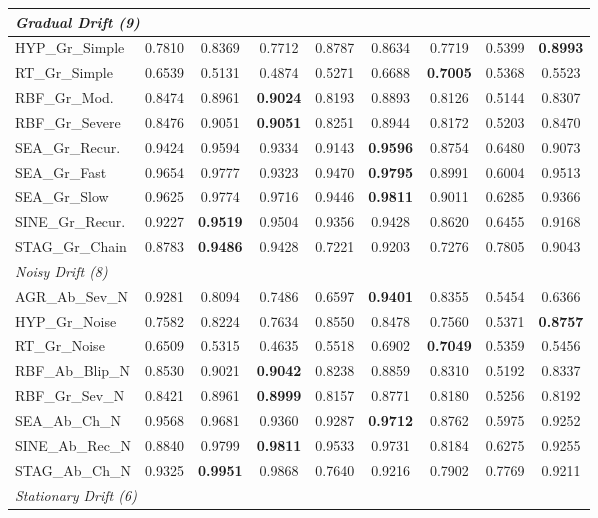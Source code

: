 \documentclass[lettersize,10pt]{article}
\begin{document}
\begin{longtable}{lcccccccc}
\midrule \multicolumn{9}{l}{\textit{Gradual Drift (9)}}\\
\midrule
HYP\_Gr\_Simple & 0.7810 & 0.8369 & 0.7712 & 0.8787 & 0.8634 & 0.7719 & 0.5399 & \textbf{0.8993} \\
RT\_Gr\_Simple & 0.6539 & 0.5131 & 0.4874 & 0.5271 & 0.6688 & \textbf{0.7005} & 0.5368 & 0.5523 \\
RBF\_Gr\_Mod. & 0.8474 & 0.8961 & \textbf{0.9024} & 0.8193 & 0.8893 & 0.8126 & 0.5144 & 0.8307 \\
RBF\_Gr\_Severe & 0.8476 & 0.9051 & \textbf{0.9051} & 0.8251 & 0.8944 & 0.8172 & 0.5203 & 0.8470 \\
SEA\_Gr\_Recur. & 0.9424 & 0.9594 & 0.9334 & 0.9143 & \textbf{0.9596} & 0.8754 & 0.6480 & 0.9073 \\
SEA\_Gr\_Fast & 0.9654 & 0.9777 & 0.9323 & 0.9470 & \textbf{0.9795} & 0.8991 & 0.6004 & 0.9513 \\
SEA\_Gr\_Slow & 0.9625 & 0.9774 & 0.9716 & 0.9446 & \textbf{0.9811} & 0.9011 & 0.6285 & 0.9366 \\
SINE\_Gr\_Recur. & 0.9227 & \textbf{0.9519} & 0.9504 & 0.9356 & 0.9428 & 0.8620 & 0.6455 & 0.9168 \\
STAG\_Gr\_Chain & 0.8783 & \textbf{0.9486} & 0.9428 & 0.7221 & 0.9203 & 0.7276 & 0.7805 & 0.9043 \\
\midrule \multicolumn{9}{l}{\textit{Noisy Drift (8)}}\\
\midrule
AGR\_Ab\_Sev\_N & 0.9281 & 0.8094 & 0.7486 & 0.6597 & \textbf{0.9401} & 0.8355 & 0.5454 & 0.6366 \\
HYP\_Gr\_Noise & 0.7582 & 0.8224 & 0.7634 & 0.8550 & 0.8478 & 0.7560 & 0.5371 & \textbf{0.8757} \\
RT\_Gr\_Noise & 0.6509 & 0.5315 & 0.4635 & 0.5518 & 0.6902 & \textbf{0.7049} & 0.5359 & 0.5456 \\
RBF\_Ab\_Blip\_N & 0.8530 & 0.9021 & \textbf{0.9042} & 0.8238 & 0.8859 & 0.8310 & 0.5192 & 0.8337 \\
RBF\_Gr\_Sev\_N & 0.8421 & 0.8961 & \textbf{0.8999} & 0.8157 & 0.8771 & 0.8180 & 0.5256 & 0.8192 \\
SEA\_Ab\_Ch\_N & 0.9568 & 0.9681 & 0.9360 & 0.9287 & \textbf{0.9712} & 0.8762 & 0.5975 & 0.9252 \\
SINE\_Ab\_Rec\_N & 0.8840 & 0.9799 & \textbf{0.9811} & 0.9533 & 0.9731 & 0.8184 & 0.6275 & 0.9255 \\
STAG\_Ab\_Ch\_N & 0.9325 & \textbf{0.9951} & 0.9868 & 0.7640 & 0.9216 & 0.7902 & 0.7769 & 0.9211 \\
\midrule \multicolumn{9}{l}{\textit{Stationary Drift (6)}}\\

\end{longtable}
\end{document}
